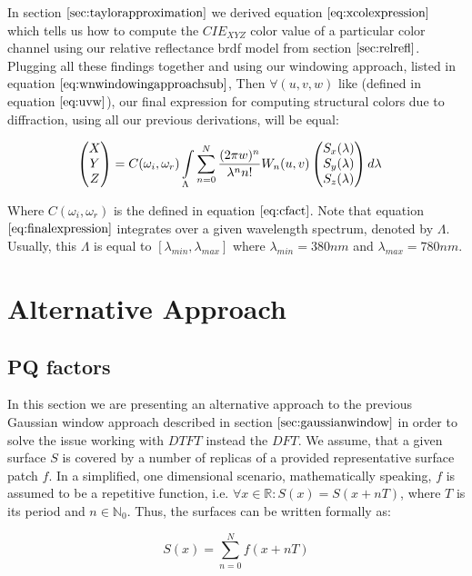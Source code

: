 In section $\ref{sec:taylorapproximation}$ we derived equation $\ref{eq:xcolexpression}$ which tells us how to compute the $CIE_{XYZ}$ color value of a particular color channel using our relative reflectance brdf model from section $\ref{sec:relrefl}$. Plugging all these findings together and using our windowing approach, listed in equation $\ref{eq:wnwindowingapproachsub}$, Then $\forall (u,v,w)$ like (defined in equation $\ref{eq:uvw}$), our final expression for computing structural colors due to diffraction, using all our previous derivations, will be equal:

\begin{equation}
\begin{split}
\colvec[X]{Y}{Z}& = C(\omega_i,\omega_r) \int \limits_{\Lambda} \sum_{n=0}^N  \frac{(2 \pi w)^n}{\lambda^n n!} W_{n}(u,v) \colvec[S_x(\lambda)]{S_y(\lambda)}{S_z(\lambda)}d\lambda
\end{split}
\label{eq:finalexpression}
\end{equation}

Where $C(\omega_i,\omega_r)$ is the defined in equation $\ref{eq:cfact}$. Note that equation $\ref{eq:finalexpression}$ integrates over a given wavelength spectrum, denoted by $\Lambda$. Usually, this $\Lambda$ is equal to $[\lambda_{min}, \lambda_{max}]$ where $\lambda_{min} = 380nm$ and $\lambda_{max}=780nm$. \\

\section{Alternative Approach}
\subsection{PQ factors}
\label{sec:pq}
In this section we are presenting an alternative approach to the previous Gaussian window approach described in section $\ref{sec:gaussianwindow}$ in order to solve the issue working with $DTFT$ instead the $DFT$. We assume, that a given surface $S$ is covered by a number of replicas of a provided representative surface patch $f$. In a simplified, one dimensional scenario, mathematically speaking, $f$ is assumed to be a repetitive function, i.e. $\forall x \in \mathds{R} : S(x) = S(x+nT)$, where $T$ is its period and $n \in \mathds{N}_{0}$. Thus, the surfaces can be written formally as:

\begin{equation}
  S(x) = \sum_{n=0}^N f(x+nT)
\label{eq:replicatedpatchsurface}
\end{equation}

